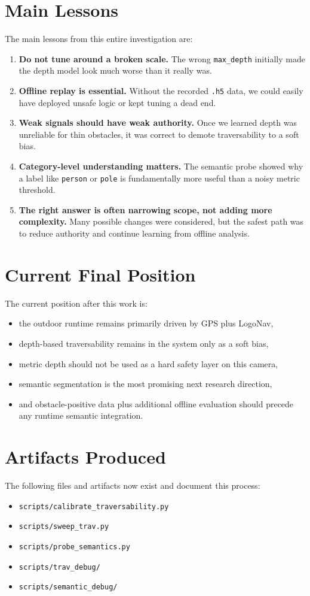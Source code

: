 \documentclass[11pt]{article}
\begin{document}
\section{Main Lessons}
The main lessons from this entire investigation are:
\begin{enumerate}[leftmargin=*]
\item \textbf{Do not tune around a broken scale.} The wrong \texttt{max\_depth} initially made the depth model look much worse than it really was.
\item \textbf{Offline replay is essential.} Without the recorded \texttt{.h5} data, we could easily have deployed unsafe logic or kept tuning a dead end.
\item \textbf{Weak signals should have weak authority.} Once we learned depth was unreliable for thin obstacles, it was correct to demote traversability to a soft bias.
\item \textbf{Category-level understanding matters.} The semantic probe showed why a label like \texttt{person} or \texttt{pole} is fundamentally more useful than a noisy metric threshold.
\item \textbf{The right answer is often narrowing scope, not adding more complexity.} Many possible changes were considered, but the safest path was to reduce authority and continue learning from offline analysis.
\end{enumerate}

\section{Current Final Position}
The current position after this work is:
\begin{itemize}[leftmargin=*]
\item the outdoor runtime remains primarily driven by GPS plus LogoNav,
\item depth-based traversability remains in the system only as a soft bias,
\item metric depth should not be used as a hard safety layer on this camera,
\item semantic segmentation is the most promising next research direction,
\item and obstacle-positive data plus additional offline evaluation should precede any runtime semantic integration.
\end{itemize}

\section{Artifacts Produced}
The following files and artifacts now exist and document this process:
\begin{itemize}[leftmargin=*]
\item \texttt{scripts/calibrate\_traversability.py}
\item \texttt{scripts/sweep\_trav.py}
\item \texttt{scripts/probe\_semantics.py}
\item \texttt{scripts/trav\_debug/}
\item \texttt{scripts/semantic\_debug/}
\end{itemize}
\end{document}
